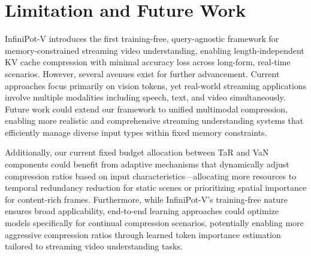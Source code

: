 \section{Limitation and Future Work}

InfiniPot-V introduces the first training-free, query-agnostic framework for memory-constrained streaming video understanding, enabling length-independent KV cache compression with minimal accuracy loss across long-form, real-time scenarios. However, several avenues exist for further advancement. Current approaches focus primarily on vision tokens, yet real-world streaming applications involve multiple modalities including speech, text, and video simultaneously. Future work could extend our framework to unified multimodal compression, enabling more realistic and comprehensive streaming understanding systems that efficiently manage diverse input types within fixed memory constraints.

Additionally, our current fixed budget allocation between TaR and VaN components could benefit from adaptive mechanisms that dynamically adjust compression ratios based on input characteristics—allocating more resources to temporal redundancy reduction for static scenes or prioritizing spatial importance for content-rich frames. Furthermore, while InfiniPot-V's training-free nature ensures broad applicability, end-to-end learning approaches could optimize models specifically for continual compression scenarios, potentially enabling more aggressive compression ratios through learned token importance estimation~\cite{huang2025locretenhancingevictionlongcontext} tailored to streaming video understanding tasks.